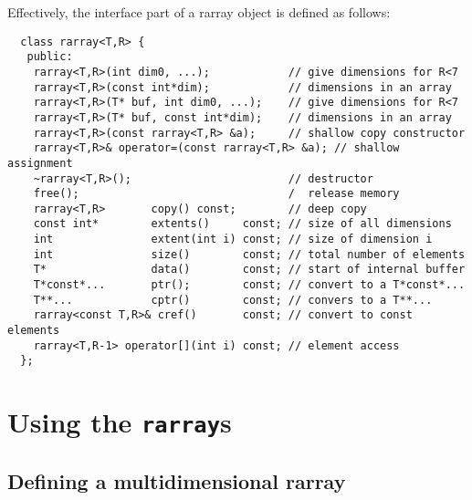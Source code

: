 \documentclass[12pt,twoside]{article}
\begin{document}
Effectively, the interface part of a rarray object is defined as follows:%
\vspace{-8pt}%
\begin{framed}\vspace{-14pt}%
\begin{verbatim}
  class rarray<T,R> {
   public:    
    rarray<T,R>(int dim0, ...);            // give dimensions for R<7
    rarray<T,R>(const int*dim);            // dimensions in an array
    rarray<T,R>(T* buf, int dim0, ...);    // give dimensions for R<7
    rarray<T,R>(T* buf, const int*dim);    // dimensions in an array
    rarray<T,R>(const rarray<T,R> &a);     // shallow copy constructor   
    rarray<T,R>& operator=(const rarray<T,R> &a); // shallow assignment
    ~rarray<T,R>();                        // destructor 
    free();                                /  release memory
    rarray<T,R>       copy() const;        // deep copy
    const int*        extents()     const; // size of all dimensions 
    int               extent(int i) const; // size of dimension i
    int               size()        const; // total number of elements
    T*                data()        const; // start of internal buffer
    T*const*...       ptr();        const; // convert to a T*const*... 
    T**...            cptr()        const; // convers to a T**... 
    rarray<const T,R>& cref()       const; // convert to const elements
    rarray<T,R-1> operator[](int i) const; // element access
  };
\end{verbatim}
\end{framed}

\section{Using the {\tt rarray}s}

\subsection{Defining a multidimensional rarray}
\end{document}
